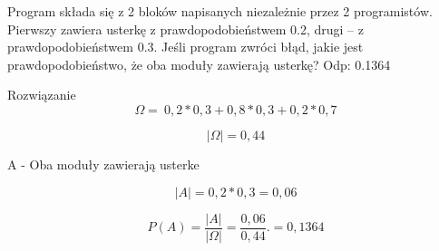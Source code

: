 \medskip
{} 
\medskip

Program składa się z 2 bloków napisanych niezależnie przez 2 programistów. Pierwszy zawiera usterkę z prawdopodobieństwem 0.2, drugi -- z prawdopodobieństwem 0.3. Jeśli program zwróci błąd, jakie jest prawdopodobieństwo, że oba moduły zawierają usterkę? Odp: 0.1364

Rozwiązanie
$$
\Omega=\  0,2 * 0,3 + 0,8 * 0,3 + 0,2 * 0,7
$$

$$
|\Omega|=0,44
$$

A - Oba moduły zawierają usterke

$$
|A|=0,2 * 0,3 = 0,06
$$

$$
P(A)=\frac{|A|}{|\Omega|}=\frac{0,06}{0,44}. = 0,1364
$$